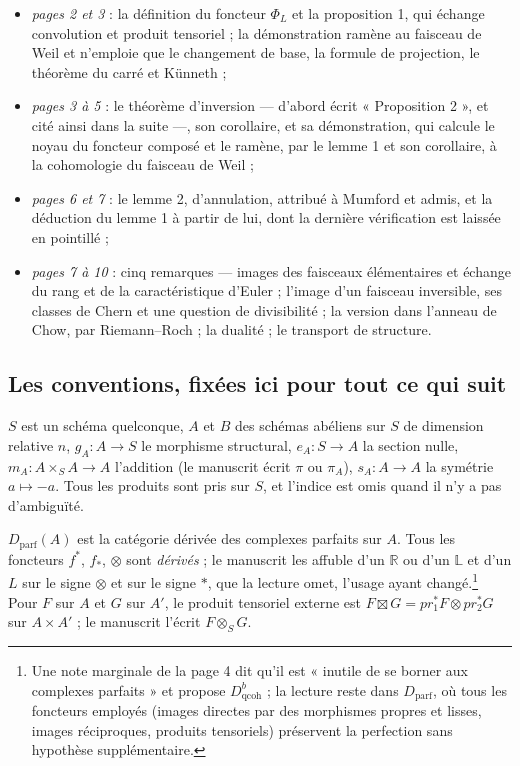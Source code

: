 \documentclass[11pt,a4paper]{article}
\begin{document}
\begin{itemize}
  \item \emph{pages 2 et 3} : la définition du foncteur $\Phi_L$ et la
  proposition 1, qui échange convolution et produit tensoriel ; la
  démonstration ramène au faisceau de Weil et n'emploie que le changement de
  base, la formule de projection, le théorème du carré et Künneth ;
  \item \emph{pages 3 à 5} : le théorème d'inversion — d'abord écrit
  « Proposition 2 », et cité ainsi dans la suite —, son corollaire, et sa
  démonstration, qui calcule le noyau du foncteur composé et le ramène,
  par le lemme 1 et son corollaire, à la cohomologie du faisceau de Weil ;
  \item \emph{pages 6 et 7} : le lemme 2, d'annulation, attribué à Mumford et
  admis, et la déduction du lemme 1 à partir de lui, dont la dernière
  vérification est laissée en pointillé ;
  \item \emph{pages 7 à 10} : cinq remarques — images des faisceaux
  élémentaires et échange du rang et de la caractéristique d'Euler ; l'image
  d'un faisceau inversible, ses classes de Chern et une question de
  divisibilité ; la version dans l'anneau de Chow, par Riemann--Roch ;
  la dualité ; le transport de structure.
\end{itemize}

\subsection*{Les conventions, fixées ici pour tout ce qui suit}

$S$ est un schéma quelconque, $A$ et $B$ des schémas abéliens sur $S$ de
dimension relative $n$, $g_A \colon A \to S$ le morphisme structural,
$e_A \colon S \to A$ la section nulle, $m_A \colon A \times_S A \to A$
l'addition (le manuscrit écrit $\pi$ ou $\pi_A$), $s_A \colon A \to A$ la
symétrie $a \mapsto -a$. Tous les produits sont pris sur $S$, et l'indice est
omis quand il n'y a pas d'ambiguïté.

$D_{\mathrm{parf}}(A)$ est la catégorie dérivée des complexes parfaits sur
$A$. Tous les foncteurs $f^{*}$, $f_{*}$, $\otimes$ sont \emph{dérivés} ; le
manuscrit les affuble d'un $\mathbb{R}$ ou d'un $\mathbb{L}$ et d'un $L$ sur
le signe $\otimes$ et sur le signe $*$, que la lecture omet, l'usage ayant
changé.\footnote{Une note marginale de la page 4 dit qu'il est « inutile de
se borner aux complexes parfaits » et propose $D^{b}_{\mathrm{qcoh}}$ ; la
lecture reste dans $D_{\mathrm{parf}}$, où tous les foncteurs employés
(images directes par des morphismes propres et lisses, images réciproques,
produits tensoriels) préservent la perfection sans hypothèse
supplémentaire.} Pour $F$ sur $A$ et $G$ sur $A'$, le produit tensoriel
externe est $F \boxtimes G = pr_1^{*}F \otimes pr_2^{*}G$ sur $A \times A'$ ;
le manuscrit l'écrit $F \otimes_S G$.
\end{document}
